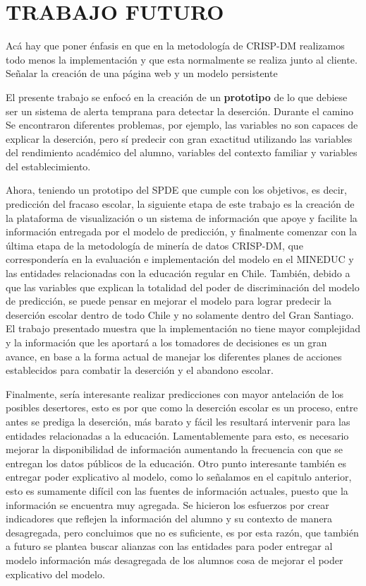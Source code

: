 \chapter{TRABAJO FUTURO}
\label{ch:trafu}
Acá hay que poner énfasis en que en la metodología de CRISP-DM realizamos todo menos la implementación y que esta normalmente se realiza junto al cliente. Señalar la creación de una página web y un modelo persistente 

El presente trabajo se enfocó en la creación de un \textbf{prototipo} de lo que debiese ser un sistema de alerta temprana para detectar la deserción. Durante el camino Se encontraron diferentes problemas, por ejemplo, las variables no son capaces de explicar la deserción, pero sí predecir con gran exactitud utilizando las variables del rendimiento académico del alumno, variables del contexto familiar y variables del establecimiento.

Ahora, teniendo un prototipo del SPDE que cumple con los objetivos, es decir, predicción del fracaso escolar, la siguiente etapa de este trabajo es la creación de la plataforma de visualización o un sistema de información que apoye y facilite la información entregada por el modelo de predicción, y finalmente comenzar con la última etapa de la metodología de minería de datos CRISP-DM, que correspondería en la evaluación e implementación del modelo en el MINEDUC y las entidades relacionadas con la educación regular en Chile. También, debido a que las variables que explican la totalidad del poder de discriminación del modelo de predicción, se puede pensar en mejorar el modelo para lograr predecir la deserción escolar dentro de todo Chile y no solamente dentro del Gran Santiago. El trabajo presentado muestra que la implementación no tiene mayor complejidad y la información que les aportará a los tomadores de decisiones es un gran avance, en base a la forma actual de manejar los diferentes planes de acciones establecidos para combatir la deserción y el abandono escolar.

Finalmente, sería interesante realizar predicciones con mayor antelación de los posibles desertores, esto es por que como la deserción escolar es un proceso, entre antes se prediga la deserción, más barato y fácil les resultará intervenir para las entidades relacionadas a la educación. Lamentablemente para esto, es necesario mejorar la disponibilidad de información aumentando la frecuencia con que se entregan los datos públicos de la educación. Otro punto interesante también es entregar poder explicativo al modelo, como lo señalamos en el capitulo anterior, esto es sumamente difícil con las fuentes de información actuales, puesto que la información se encuentra muy agregada. Se hicieron los esfuerzos por crear indicadores que reflejen la información del alumno y su contexto de manera desagregada, pero concluimos que no es suficiente, es por esta razón, que también a futuro se plantea buscar alianzas con las entidades para poder entregar al modelo información más desagregada de los alumnos cosa de mejorar el poder explicativo del modelo.

